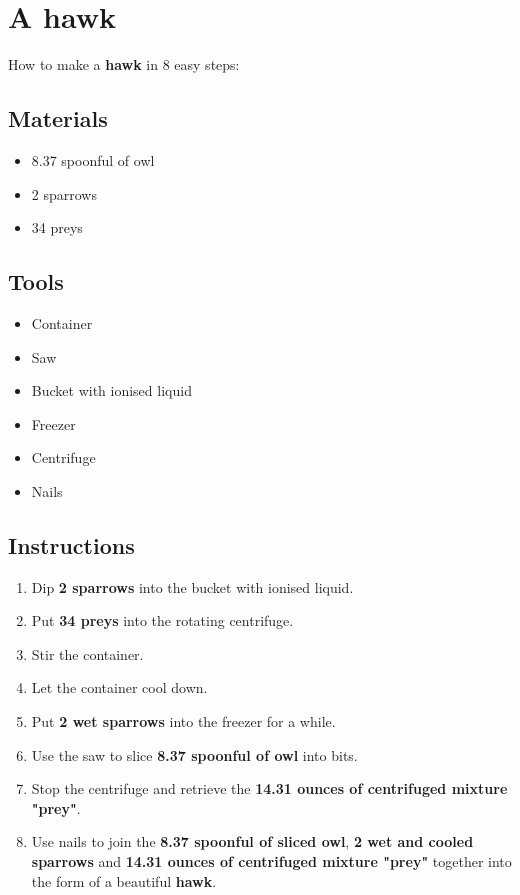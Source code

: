 \documentclass{article}
\begin{document}
\section{A hawk}How to make a \textbf{hawk} in 8 easy steps:

\subsection{Materials}\begin{itemize}
\item 
8.37 spoonful of owl
\item 
2 sparrows
\item 
34 preys
\end{itemize}
\subsection{Tools}\begin{itemize}
\item 
Container
\item 
Saw
\item 
Bucket with ionised liquid
\item 
Freezer
\item 
Centrifuge
\item 
Nails
\end{itemize}
\subsection{Instructions}\begin{enumerate}
\item 
Dip \textbf{2 sparrows} into the bucket with ionised liquid.
\item 
Put \textbf{34 preys} into the rotating centrifuge.
\item 
Stir the container.
\item 
Let the container cool down.
\item 
Put \textbf{2 wet sparrows} into the freezer for a while.
\item 
Use the saw to slice \textbf{8.37 spoonful of owl} into bits.
\item 
Stop the centrifuge and retrieve the \textbf{14.31 ounces of centrifuged mixture "prey"}.
\item 
Use nails to join the \textbf{8.37 spoonful of sliced owl}, \textbf{2 wet and cooled sparrows} and \textbf{14.31 ounces of centrifuged mixture "prey"} together into the form of a beautiful \textbf{hawk}.
\end{enumerate}
\newpage
\end{document}
